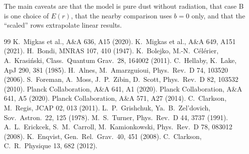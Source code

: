 \documentclass[10pt,twocolumn,letterpaper]{article}
\begin{document}
The main caveats are that the model is pure dust without radiation, that case B is one choice of $E(r)$, that the nearby comparison uses $b=0$ only, and that the ``scaled'' rows extrapolate linear results.


\begin{thebibliography}{99}\scriptsize\setlength{\itemsep}{0pt}
 K.~Migkas et al., A\&A 636, A15 (2020).
 K.~Migkas et al., A\&A 649, A151 (2021).
 H.~Bondi, MNRAS 107, 410 (1947).
 K.~Bolejko, M.-N.~C\'el\'erier, A.~Krasi\'nski, Class.\ Quantum Grav.\ 28, 164002 (2011).
 C.~Hellaby, K.~Lake, ApJ 290, 381 (1985).
 H.~Alnes, M.~Amarzguioui, Phys.\ Rev.\ D 74, 103520 (2006).
 S.~Foreman, A.~Moss, J.~P.~Zibin, D.~Scott, Phys.\ Rev.\ D 82, 103532 (2010).
 Planck Collaboration, A\&A 641, A1 (2020).
 Planck Collaboration, A\&A 641, A5 (2020).
 Planck Collaboration, A\&A 571, A27 (2014).
 C.~Clarkson, M.~Regis, JCAP 02, 013 (2011).
 L.~P.~Grishchuk, Ya.~B.~Zel'dovich, Sov.\ Astron.\ 22, 125 (1978).
 M.~S.~Turner, Phys.\ Rev.\ D 44, 3737 (1991).
 A.~L.~Erickcek, S.~M.~Carroll, M.~Kamionkowski, Phys.\ Rev.\ D 78, 083012 (2008).
 K.~Enqvist, Gen.\ Rel.\ Grav.\ 40, 451 (2008).
 C.~Clarkson, C.\ R.\ Physique 13, 682 (2012).
\end{thebibliography}
\end{document}
